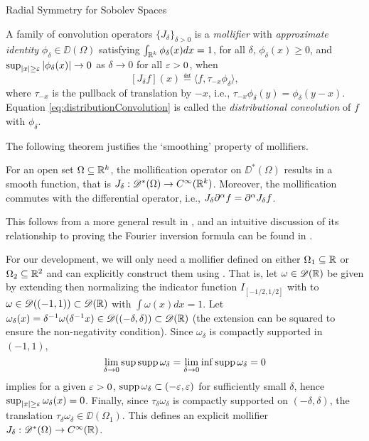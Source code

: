 \begin{chapter}{Radial Symmetry for Sobolev Spaces}
\begin{com}
A family of convolution operators $\{J_\delta\}_{\delta>0}$ is a \emph{mollifier} with \emph{approximate identity} $\phi_\delta \in \DD(\Omega)$ satisfying $\int_{\mathbb R^k} \phi_\delta(x)dx = 1$, for all $\delta$, $\phi_\delta(x) \ge 0$, and $\sup_{|x|\ge\varepsilon}|\phi_\delta(x)|\to0$ as $\delta\to 0$ for all $\varepsilon >0$, when
\begin{equation} \label{eq:distributionConvolution}
  [J_\delta f](x) \eqdef \langle f, \tau_{-x}\phi_\delta\rangle,
\end{equation}
where $\tau_{-x}$ is the pullback of translation by $-x$, i.e., $\tau_{-x}\phi_\delta(y) = \phi_\delta(y-x)$.
Equation \eqref{eq:distributionConvolution} is called the \emph{distributional convolution} of $f$ with $\phi_\delta$.

The following theorem justifies the `smoothing' property of mollifiers.
\begin{thm}
  For an open set $\Omega \subseteq \mathbb R^k$, the mollification operator on $\DD^*(\Omega)$ results in a smooth function, that is $J_\delta:\mathscr D^*(\Omega) \to C^\infty(\mathbb R^k)$.
  Moreover, the mollification commutes with the differential operator, i.e., $J_\delta \partial^{\alpha} f = \partial^{\alpha} J_\delta f$. 
\end{thm}
This follows from a more general result in , and an intuitive discussion of its relationship to proving the Fourier inversion formula can be found in .

For our development, we will only need a mollifier defined on either $\Omega_1 \subseteq \mathbb R$ or $\Omega_2 \subseteq \mathbb R^2$ and can explicitly construct them using . 
That is, let $\omega \in \mathscr D(\mathbb R)$ be given by extending then normalizing the indicator function $I_{[-1/2,1/2]}$ with  to $\omega\in \mathscr D((-1,1)) \subset \mathscr D(\mathbb R)$ with $\int \omega(x) dx = 1$. 
Let $\omega_{\delta}(x) = \delta^{-1}\omega(\delta^{-1}x) \in \mathscr D( (-\delta,\delta) ) \subset \mathscr D(\mathbb R)$ (the extension can be squared to ensure the non-negativity condition). 
Since $\omega_\delta$ is compactly supported in $(-1,1)$, 
\begin{equation}
  \lim_{\delta\to 0} \sup\operatorname*{supp} \omega_\delta = \lim_{\delta\to 0} \inf \operatorname*{supp} \omega_\delta = 0
\end{equation}
implies for a given $\varepsilon >0$, $\operatorname*{supp} \omega_\delta \subset (-\varepsilon,\varepsilon)$ for sufficiently small $\delta$, hence $\sup_{|x|\ge \varepsilon}\omega_\delta(x) = 0$.
Finally, since $\tau_\delta\omega_\delta$ is compactly supported on $(-\delta,\delta)$, the translation $\tau_\delta\omega_\delta \in \DD(\Omega_1)$.
This defines an explicit mollifier $J_\delta:\mathscr D^*(\Omega) \to C^\infty(\mathbb R)$.


\end{com}
\end{chapter}
